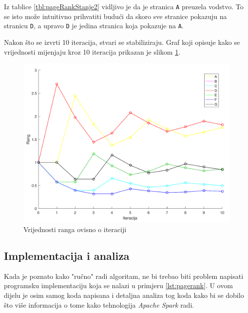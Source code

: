 \documentclass[times, utf8, zavrsni, numeric]{fer}
\begin{document}
Iz tablice \ref{tbl:pageRankStanje2} vidljivo je da je stranica \texttt{A} preuzela vodstvo. To se isto može intuitivno prihvatiti budući da skoro sve stranice pokazuju na stranicu \texttt{D}, a upravo \texttt{D} je jedina stranica koja pokazuje na \texttt{A}.

Nakon što se izvrti 10 iteracija, stvari se stabiliziraju. Graf koji opisuje kako se vrijednosti  mijenjaju kroz 10 iteracija prikazan je slikom \ref{fig:grafRangIteracija}.

\begin{figure}[htb]
\centering
\includegraphics[scale = 0.5]{img/grafPageRankStraniceCropped.pdf}
\caption{Vrijednosti ranga ovisno o iteraciji}
\label{fig:grafRangIteracija}
\end{figure}

\subsection{Implementacija i analiza}
Kada je poznato kako "ručno" radi algoritam, ne bi trebao biti problem napisati programsku implementaciju koja se nalazi u primjeru \ref{lst:pagerank}. U ovom dijelu je osim samog koda napisana i detaljna analiza tog koda kako bi se dobilo što više informacija o tome kako tehnologija \emph{Apache Spark} radi. 
\end{document}
